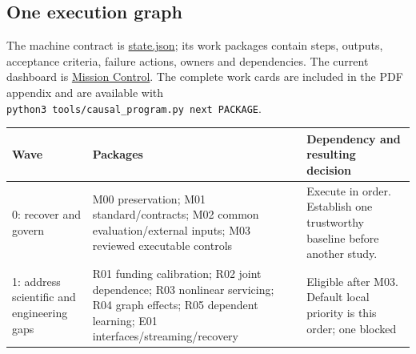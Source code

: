 \documentclass[
  11pt,
  a4paper,
]{article}
\begin{document}
\hypertarget{one-execution-graph}{%
\subsection{One execution graph}\label{one-execution-graph}}

The machine contract is \url{state.json}; its work packages contain
steps, outputs, acceptance criteria, failure actions, owners and
dependencies. The current dashboard is
\href{../mission-control.md}{Mission Control}. The complete work cards
are included in the PDF appendix and are available with
\texttt{python3\ tools/causal\_program.py\ next\ PACKAGE}.

\begin{longtable}[]{@{}lll@{}}
\toprule
\begin{minipage}[b]{0.30\columnwidth}\raggedright
Wave\strut
\end{minipage} & \begin{minipage}[b]{0.30\columnwidth}\raggedright
Packages\strut
\end{minipage} & \begin{minipage}[b]{0.30\columnwidth}\raggedright
Dependency and resulting decision\strut
\end{minipage}\tabularnewline
\midrule
\endhead
\begin{minipage}[t]{0.30\columnwidth}\raggedright
0: recover and govern\strut
\end{minipage} & \begin{minipage}[t]{0.30\columnwidth}\raggedright
M00 preservation; M01 standard/contracts; M02 common evaluation/external
inputs; M03 reviewed executable controls\strut
\end{minipage} & \begin{minipage}[t]{0.30\columnwidth}\raggedright
Execute in order. Establish one trustworthy baseline before another
study.\strut
\end{minipage}\tabularnewline
\begin{minipage}[t]{0.30\columnwidth}\raggedright
1: address scientific and engineering gaps\strut
\end{minipage} & \begin{minipage}[t]{0.30\columnwidth}\raggedright
R01 funding calibration; R02 joint dependence; R03 nonlinear servicing;
R04 graph effects; R05 dependent learning; E01
interfaces/streaming/recovery\strut
\end{minipage} & \begin{minipage}[t]{0.30\columnwidth}\raggedright
Eligible after M03. Default local priority is this order; one blocked

\end{minipage}
\end{longtable}
\end{document}

